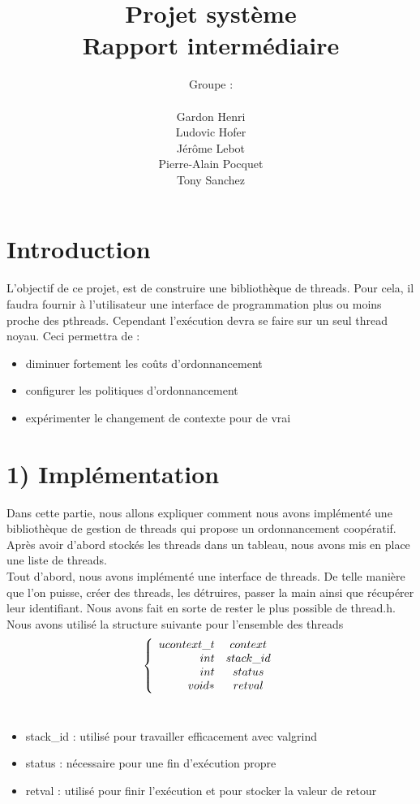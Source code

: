 \documentclass{report}
\author{Groupe :\\ \\Gardon Henri\\Ludovic Hofer\\Jérôme Lebot\\Pierre-Alain Pocquet\\Tony Sanchez}
\title{Projet système \\ Rapport intermédiaire}
\begin{document}
\maketitle

\section*{Introduction}
 
 L'objectif de ce projet, est de construire une bibliothèque de threads. Pour cela, il faudra fournir à l'utilisateur une interface de programmation plus ou moins proche des pthreads.
 Cependant l'exécution devra se faire sur un seul thread noyau.
 Ceci permettra de :
 \\
 \begin{itemize}
 \item diminuer fortement les coûts d'ordonnancement
 \item configurer les politiques d'ordonnancement
 \item expérimenter le changement de contexte pour de vrai
 \end{itemize}

\section*{1) Implémentation}
 
 	Dans cette partie, nous allons expliquer comment nous avons implémenté une bibliothèque de gestion de threads qui propose un ordonnancement coopératif. Après avoir d'abord stockés les threads dans un tableau, nous avons mis en place une liste de threads.%
 \\
	Tout d'abord, nous avons implémenté une interface de threads. De telle manière que l'on puisse, créer des threads, les détruires, passer la main ainsi que récupérer leur identifiant. Nous avons fait en sorte de rester le plus possible de thread.h. 
\\
Nous avons utilisé la structure suivante pour l'ensemble des threads
\\
\[
\left\{
\begin{array}{r c }
ucontext\_t &context\\
int &stack\_id\\
int & status\\
void* & retval
\end{array}
\right.
\]
\\
\begin{itemize}
\item stack\_id : utilisé pour travailler efficacement avec valgrind
\item status : nécessaire pour une fin d'exécution propre
\item retval : utilisé pour finir l'exécution et pour stocker la valeur de retour
\end{itemize}
\end{document}

